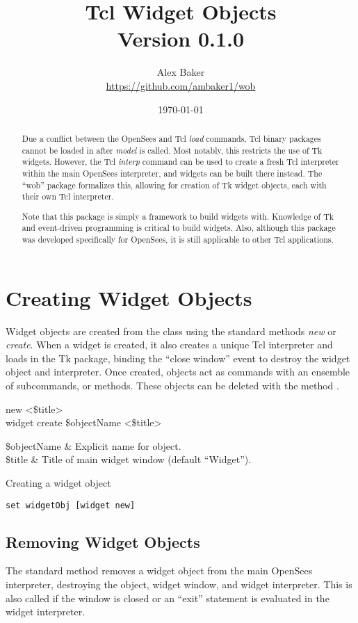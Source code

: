 \documentclass{article}
\title{\Huge Tcl Widget Objects\\\small Version 0.1.0}
\author{Alex Baker\\\small\hyperlink{https://github.com/ambaker1/wob}{https://github.com/ambaker1/wob}}
\date{\small\today}
\renewcommand{\^}[1]{\textsuperscript{#1}}
\renewcommand{\_}[1]{\textsubscript{#1}}
\begin{document}
\maketitle
\begin{abstract}
Due a conflict between the OpenSees and Tcl \textit{load} commands, Tcl binary packages cannot be loaded in after \textit{model} is called. Most notably, this restricts the use of Tk widgets. 
However, the Tcl \textit{interp} command can be used to create a fresh Tcl interpreter within the main OpenSees interpreter, and widgets can be built there instead. 
The ``wob'' package formalizes this, allowing for creation of Tk widget objects, each with their own Tcl interpreter.

Note that this package is simply a framework to build widgets with. 
Knowledge of Tk and event-driven programming is critical to build widgets.
Also, although this package was developed specifically for OpenSees, it is still applicable to other Tcl applications.
\end{abstract}

\clearpage
\section{Creating Widget Objects}
Widget objects are created from the  class using the standard methods \textit{new} or \textit{create}. 
When a widget is created, it also creates a unique Tcl interpreter and loads in the Tk package, binding the ``close window'' event to destroy the widget object and interpreter.
Once created,  objects act as commands with an ensemble of subcommands, or methods. 
These objects can be deleted with the method .
\begin{syntax}
   	 new <\$title> \\
   	widget create \$objectName <\$title>
\end{syntax}
\begin{args}
   	\$objectName & Explicit name for object. \\
   	\$title & Title of main widget window (default ``Widget'').
\end{args}
\begin{example}{Creating a widget object}
\begin{lstlisting}
set widgetObj [widget new]
\end{lstlisting}
\end{example}
\subsection{Removing Widget Objects}
The standard method  removes a widget object from the main OpenSees interpreter, destroying the object, widget window, and widget interpreter.
This is also called if the window is closed or an ``exit'' statement is evaluated in the widget interpreter.
\begin{syntax}
\end{syntax}
\end{document}

